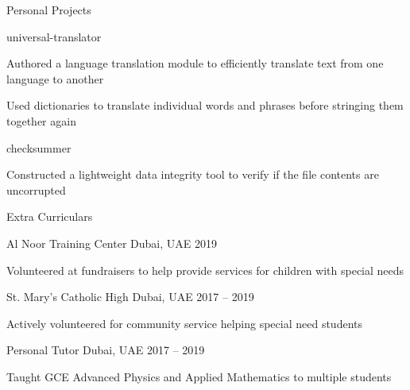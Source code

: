 \documentclass{resume} %
\begin{document}
\begin{rSection}{Personal Projects}
  \begin{rSubsection} {universal-translator} {} {} {}
    \item Authored a language translation module to efficiently translate
      text from one language to another
    \item Used dictionaries to translate individual words and phrases before
      stringing them together again
  \end{rSubsection}

  \begin{rSubsection} {checksummer} {} {} {}
    \item Constructed a lightweight data integrity tool to verify if the file
      contents are uncorrupted
  \end{rSubsection}

\end{rSection}


\begin{rSection}{Extra Curriculars}
  \begin{rSubsection} {Al Noor Training Center} {Dubai, UAE} {} {2019}
    \item Volunteered at fundraisers to help provide services
      for children with special needs
  \end{rSubsection}

  \begin{rSubsection} {St. Mary's Catholic High} {Dubai, UAE} {} {2017 -- 2019}
    \item Actively volunteered for community service helping special need students 
  \end{rSubsection}

  \begin{rSubsection} {Personal Tutor} {Dubai, UAE} {} {2017 -- 2019}
    \item Taught GCE Advanced Physics and Applied Mathematics to multiple students
  \end{rSubsection}

\end{rSection}
\end{document}
